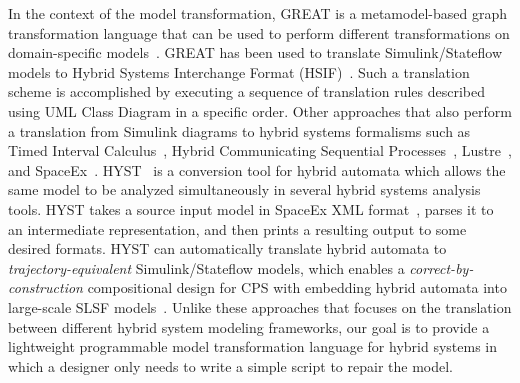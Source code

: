 In the context of the model transformation, GREAT is a metamodel-based graph transformation language that can be used to perform different transformations on domain-specific models~\cite{agrawal2003graph, agrawal2003end}. GREAT has been used to translate Simulink/Stateflow models to Hybrid Systems Interchange Format (HSIF)~\cite{agrawal2004semantic}. Such a translation scheme is accomplished by executing a sequence of translation rules described using UML Class Diagram in a specific order. %
% 
Other approaches that also perform a translation from Simulink diagrams to hybrid systems formalisms such as Timed Interval Calculus~\cite{chen2009formal}, Hybrid Communicating Sequential Processes~\cite{liu2010calculus}, Lustre~\cite{tripakis2005translating}, and SpaceEx~\cite{minopoli2016sl2sx}.  
%
HYST~\cite{bak2015hyst} is a conversion tool for hybrid automata which allows the same model to be analyzed simultaneously in several hybrid systems analysis tools. HYST takes a source input model in SpaceEx XML format~\cite{frehse2011spaceex}, parses it to an intermediate representation, and then prints a resulting output to some desired formats. HYST can automatically translate hybrid automata to \emph{trajectory-equivalent} Simulink/Stateflow models, which enables a \emph{correct-by-construction} compositional design for CPS with embedding hybrid automata into large-scale SLSF models~\cite{bak2017hybrid}.  
%
Unlike these approaches that focuses on the translation between different hybrid system modeling frameworks, our goal is to provide a lightweight programmable model transformation language for hybrid systems in which a designer only needs to write a simple script to repair the model.  
 
%









